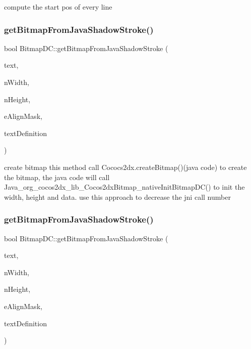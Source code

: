 compute the start pos of every line \mbox{\label{classBitmapDC_a734c131882b3607827c9685807943019}} 
\subsubsection{\texorpdfstring{get\+Bitmap\+From\+Java\+Shadow\+Stroke()}{getBitmapFromJavaShadowStroke()}\hspace{0.1cm}{\footnotesize\ttfamily [1/2]}}
{\footnotesize\ttfamily bool Bitmap\+D\+C\+::get\+Bitmap\+From\+Java\+Shadow\+Stroke (\begin{DoxyParamCaption}\item[{const char $\ast$}]{text,  }\item[{int}]{n\+Width,  }\item[{int}]{n\+Height,  }\item[{\hyperlink{classDevice_a62f8577d4803c8fce764f7cdff2abe92}{Device\+::\+Text\+Align}}]{e\+Align\+Mask,  }\item[{const \hyperlink{structFontDefinition}{Font\+Definition} \&}]{text\+Definition }\end{DoxyParamCaption})\hspace{0.3cm}{\ttfamily [inline]}}

create bitmap this method call Cococs2dx.\+create\+Bitmap()(java code) to create the bitmap, the java code will call Java\+\_\+org\+\_\+cocos2dx\+\_\+lib\+\_\+\+Cocos2dx\+Bitmap\+\_\+native\+Init\+Bitmap\+D\+C() to init the width, height and data. use this approach to decrease the jni call number\mbox{\label{classBitmapDC_a734c131882b3607827c9685807943019}} 
\subsubsection{\texorpdfstring{get\+Bitmap\+From\+Java\+Shadow\+Stroke()}{getBitmapFromJavaShadowStroke()}\hspace{0.1cm}{\footnotesize\ttfamily [2/2]}}
{\footnotesize\ttfamily bool Bitmap\+D\+C\+::get\+Bitmap\+From\+Java\+Shadow\+Stroke (\begin{DoxyParamCaption}\item[{const char $\ast$}]{text,  }\item[{int}]{n\+Width,  }\item[{int}]{n\+Height,  }\item[{\hyperlink{classDevice_a62f8577d4803c8fce764f7cdff2abe92}{Device\+::\+Text\+Align}}]{e\+Align\+Mask,  }\item[{const \hyperlink{structFontDefinition}{Font\+Definition} \&}]{text\+Definition }\end{DoxyParamCaption})\hspace{0.3cm}{\ttfamily [inline]}}

